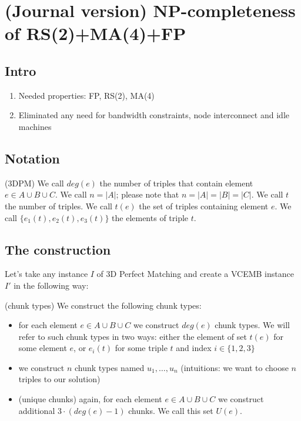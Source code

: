 \section{(Journal version) NP-completeness of RS(2)+MA(4)+FP}

\subsection{Intro}

\begin{enumerate}
  \item Needed properties: FP, RS(2), MA(4)
  \item Eliminated any need for bandwidth constraints, node interconnect and idle machines
\end{enumerate}

\subsection{Notation}

(3DPM) We call $deg(e)$ the number of triples that contain element
$e\in A\cup B\cup C$. We call $n=|A|$; please note that
$n=|A|=|B|=|C|$. We call $t$ the number of triples. We call $t(e)$ the
set of triples containing element $e$. We call
$\lbrace e_1(t), e_2(t), e_3(t) \rbrace$ the elements of triple $t$.

\subsection{The construction}

Let's take any instance $I$ of 3D Perfect Matching and create a VCEMB
instance $I'$ in the following way:

(chunk types) We construct the following chunk types:
\begin{itemize}
\item for each element $e\in A\cup B\cup C$ we construct $deg(e)$
  chunk types. We will refer to such chunk types in two ways: either
  the element of set $t(e)$ for some element $e$, or $e_i(t)$ for some
  triple $t$ and index $i \in \{1,2,3\}$
\item we construct $n$ chunk types named $u_1, \ldots, u_n$ (intuitions: we want to choose $n$ triples to our solution)
\item (unique chunks) again, for each element $e\in A\cup B\cup C$ we construct additional $3\cdot(deg(e) - 1)$ chunks. We call this set $U(e)$.
\end{itemize}

